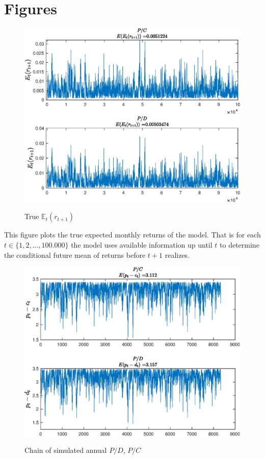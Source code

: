 \section{Figures}

\begin{figure}[H]
    \centering
    \caption{True $\mathbb{E}_t\left(r_{t+1}\right)$}
    \includegraphics{Figures/Excess_Rets.eps}
    \label{fig:ExpExRets}
\end{figure}
This figure plots the true expected monthly returns of the model. That is for each $t\in\{1,2,...,100.000\}$ the model uses available information up until $t$ to determine the conditional future mean of returns before $t+1$ realizes. 

\begin{figure}[H]
    \centering
    \caption{Chain of simulated annual $P/D$, $P/C$}
    \includegraphics{Figures/PCPD_chain.eps}
    \label{fig:PCPD}
\end{figure}



